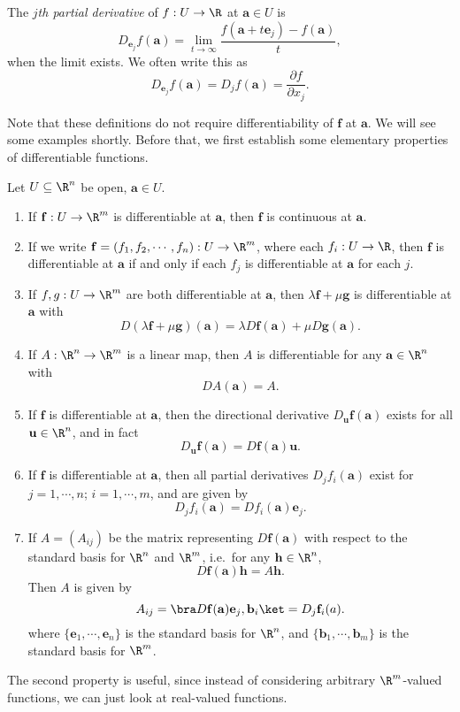 \documentclass[a4paper]{article}
\begin{document}
\begin{defi}
  The \emph{$j$th partial derivative} of $f: U \to \R$ at $\mathbf{a} \in U$ is
  \[
    D_{\mathbf{e}_j} f(\mathbf{a}) = \lim_{t \to \infty} \frac{f(\mathbf{a} + t \mathbf{e}_j) - f(\mathbf{a})}{t},
  \]
  when the limit exists. We often write this as
  \[
    D_{\mathbf{e}_j} f(\mathbf{a}) = D_j f(\mathbf{a}) = \frac{\partial f}{\partial x_j}.
  \]
\end{defi}
Note that these definitions do not require differentiability of $\mathbf{f}$ at $\mathbf{a}$. We will see some examples shortly. Before that, we first establish some elementary properties of differentiable functions.
\begin{prop}
  Let $U \subseteq \R^n$ be open, $\mathbf{a} \in U$.
  \begin{enumerate}
    \item If $\mathbf{f}: U \to \R^m$ is differentiable at $\mathbf{a}$, then $\mathbf{f}$ is continuous at $\mathbf{a}$.
    \item If we write $\mathbf{f} = (f_1, f_2, \cdots, f_n): U \to \R^m$, where each $f_i: U \to \R$, then $\mathbf{f}$ is differentiable at $\mathbf{a}$ if and only if each $f_j$ is differentiable at $\mathbf{a}$ for each $j$.
    \item If $f, g: U \to \R^m$ are both differentiable at $\mathbf{a}$, then $\lambda \mathbf{f} + \mu \mathbf{g}$ is differentiable at $\mathbf{a}$ with
      \[
        D( \lambda \mathbf{f} + \mu \mathbf{g})(\mathbf{a}) = \lambda D \mathbf{f}(\mathbf{a}) + \mu D \mathbf{g}(\mathbf{a}).
      \]
    \item If $A: \R^n \to \R^m$ is a linear map, then $A$ is differentiable for any $\mathbf{a} \in \R^n$ with
      \[
        D A(\mathbf{a}) = A.
      \]
    \item If $\mathbf{f}$ is differentiable at $\mathbf{a}$, then the directional derivative $D_\mathbf{u} \mathbf{f}(\mathbf{a})$ exists for all $\mathbf{u} \in \R^n$, and in fact
      \[
        D_{\mathbf{u}} \mathbf{f}(\mathbf{a}) = D \mathbf{f}(\mathbf{a}) \mathbf{u}.
      \]
    \item If $\mathbf{f}$ is differentiable at $\mathbf{a}$, then all partial derivatives $D_j f_i(\mathbf{a})$ exist for $j = 1, \cdots, n$; $i = 1, \cdots, m$, and are given by
      \[
        D_j f_i(\mathbf{a}) = D f_i(\mathbf{a}) \mathbf{e}_j.
      \]
    \item If $A = (A_{ij})$ be the matrix representing $D \mathbf{f}(\mathbf{a})$ with respect to the standard basis for $\R^n$ and $\R^m$, i.e.\ for any $\mathbf{h} \in \R^n$,
      \[
        D \mathbf{f}(\mathbf{a}) \mathbf{h} = A \mathbf{h}.
      \]
      Then $A$ is given by
      \[
        A_{ij} = \bra D \mathbf{f}(\mathbf{a}) \mathbf{e}_j, \mathbf{b}_i\ket = D_j \mathbf{f}_i (a).
      \]
      where $\{\mathbf{e}_1, \cdots, \mathbf{e}_n\}$ is the standard basis for $\R^n$, and $\{\mathbf{b}_1, \cdots, \mathbf{b}_m\}$ is the standard basis for $\R^m$.
  \end{enumerate}
\end{prop}
The second property is useful, since instead of considering arbitrary $\R^m$-valued functions, we can just look at real-valued functions.
\end{document}
